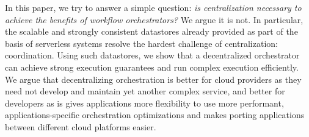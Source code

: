 %



In this paper, we try to answer a simple question: \textit{is centralization
\emph{necessary} to achieve the benefits of workflow  orchestrators?} We argue
it is not. In particular, the scalable and strongly consistent datastores
already provided as part of the basis of serverless systems resolve the hardest
challenge of centralization: coordination. Using such datastores, we show that a
decentralized orchestrator can achieve strong execution guarantees and run
complex execution efficiently. We argue that decentralizing orchestration
is better for cloud providers as they need not develop and maintain yet another
complex service, and better for developers as is gives applications more
flexibility to use more performant, applications-specific orchestration
optimizations and makes porting applications between different cloud platforms
easier.

